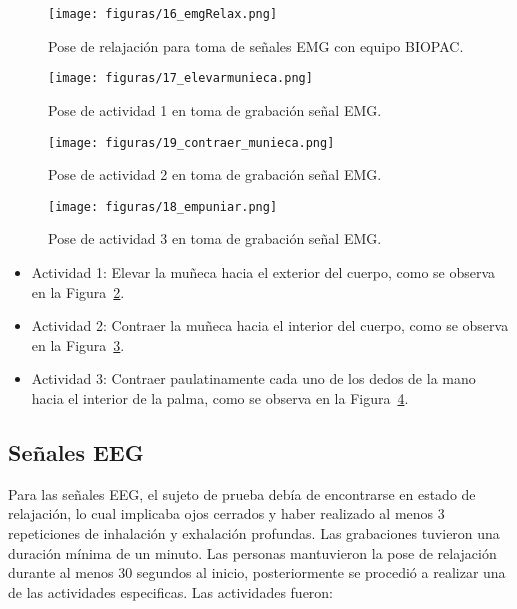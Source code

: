 \begin{figure}[t]
    \centering
    \texttt{[image: figuras/16\_emgRelax.png]}
    \caption{Pose de relajación para toma de señales EMG con equipo BIOPAC.}
    \label{fig:relax_emg}
\end{figure}

\begin{figure}[t]
    \centering
    \texttt{[image: figuras/17\_elevarmunieca.png]}
    \caption{Pose de actividad 1 en toma de grabación señal EMG.}
    \label{fig:actividad1_emg}
\end{figure}

\begin{figure}[H]
    \centering
    \texttt{[image: figuras/19\_contraer\_munieca.png]}
    \caption{Pose de actividad 2 en toma de grabación señal EMG.}
    \label{fig:actividad2_emg}
\end{figure}

\begin{figure}[H]
    \centering
    \texttt{[image: figuras/18\_empuniar.png]}
    \caption{Pose de actividad 3 en toma de grabación señal EMG.}
    \label{fig:actividad3_emg}
\end{figure}

\begin{itemize}    
    \item Actividad 1:
    Elevar la muñeca hacia el exterior del cuerpo, como se observa en la Figura~\ref{fig:actividad1_emg}.    
    \item Actividad 2:
    Contraer la muñeca hacia el interior del cuerpo, como se observa en la Figura~\ref{fig:actividad2_emg}.     
    \item Actividad 3:
    Contraer paulatinamente cada uno de los dedos de la mano hacia el interior de la palma, como se observa en la Figura~\ref{fig:actividad3_emg}.    
\end{itemize}

\subsection{Señales EEG}
Para las señales EEG, el sujeto de prueba debía de encontrarse en estado de relajación, lo cual implicaba ojos cerrados y haber realizado al menos 3 repeticiones de inhalación y exhalación profundas.
Las grabaciones tuvieron una duración mínima de un minuto. Las personas mantuvieron la pose de relajación durante al menos 30 segundos al inicio, posteriormente se procedió a realizar una de las actividades especificas. Las actividades fueron:

